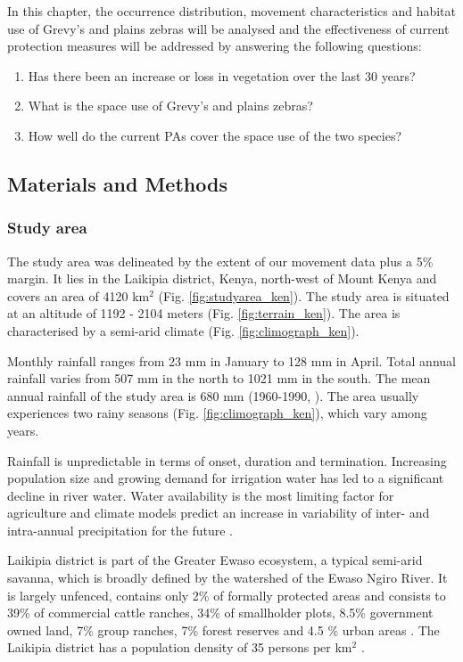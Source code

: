 \documentclass[12pt,a4paper, twoside, english]{article}
\begin{document}
In this chapter, the occurrence distribution, movement characteristics and habitat use of Grevy's and plains zebras will be analysed and the effectiveness of current protection measures will be addressed by answering the following questions:

\begin{enumerate}
  \item Has there been an increase or loss in vegetation over the last 30 years?
  \item What is the space use of Grevy's and plains zebras? 
  \item How well do the current PAs cover the space use of the two species?
\end{enumerate}

\subsection{Materials and Methods}

\subsubsection{Study area}

The study area was delineated by the extent of our movement data plus a 5\% margin. It lies in the Laikipia district, Kenya, north-west of Mount Kenya and covers an area of 4120 km$^{2}$ (Fig. \ref{fig:studyarea_ken}). The study area is situated at an altitude of 1192 - 2104 meters (Fig. \ref{fig:terrain_ken}). The area is characterised by a semi-arid climate (Fig. \ref{fig:climograph_ken}). 

Monthly rainfall ranges from 23 mm in January to 128 mm in April. Total annual rainfall varies from 507 mm in the north to 1021 mm in the south. The mean annual rainfall of the study area is 680 mm (1960-1990, \cite{Hijmans2005}). The area usually experiences two rainy seasons (Fig. \ref{fig:climograph_ken}), which vary among years. 

Rainfall is unpredictable in terms of onset, duration and termination. Increasing population size and growing demand for irrigation water has led to a significant decline in river water. Water availability is the most limiting factor for agriculture and climate models predict an increase in variability of inter- and intra-annual precipitation for the future \citep{Ulrich2012}.

Laikipia district is part of the Greater Ewaso ecosystem, a typical semi-arid savanna, which is broadly defined by the watershed of the Ewaso Ngiro River. It is largely unfenced, contains only 2\% of formally protected areas and consists to 39\% of commercial cattle ranches, 34\% of smallholder plots, 8.5\% government owned land, 7\% group ranches, 7\% forest reserves and 4.5 \% urban areas \citep{Georgiadis2003, Sundaresan2012, Evans2016a}. The Laikipia district has a population density of 35 persons per km$^{2}$ \citep{Ayeri2012}. 
\end{document}
